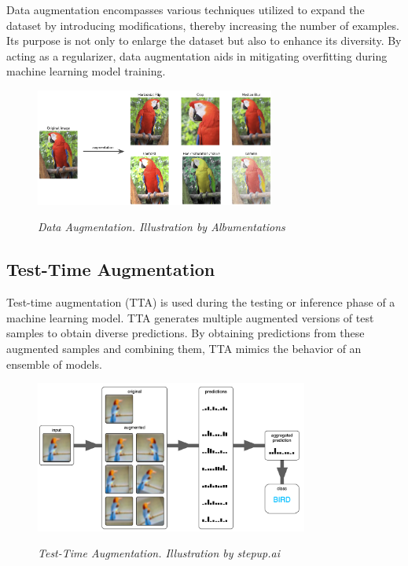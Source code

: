 Data augmentation encompasses various techniques utilized to expand the dataset by introducing modifications, thereby increasing the number of examples. Its purpose is not only to enlarge the dataset but also to enhance its diversity. By acting as a regularizer, data augmentation aids in mitigating overfitting during machine learning model training.

\begin{figure}[H]
\centering
\includegraphics[width=0.7\textwidth]{imatges/preliminaries/augmentation.jpg}
\caption[Data Augmentation]{\textit{Data Augmentation. Illustration by Albumentations}}
{\label{fig:augmentation}}
\end{figure}


\subsection{Test-Time Augmentation}

Test-time augmentation (TTA) is used during the testing or inference phase of a machine learning model. TTA generates multiple augmented versions of test samples to obtain diverse predictions. By obtaining predictions from these augmented samples and combining them, TTA mimics the behavior of an ensemble of models.

\begin{figure}[H]
\centering
\includegraphics[width=0.8\textwidth]{imatges/preliminaries/tta.png}
\caption[Test-Time Augmentation]{\textit{Test-Time Augmentation. Illustration by stepup.ai}}
{\label{fig:tta}}
\end{figure}

